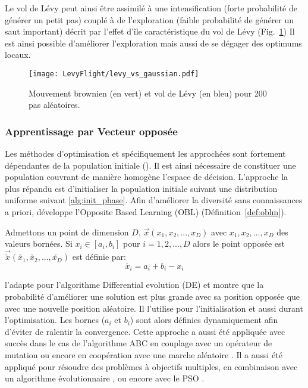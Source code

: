 Le vol de Lévy peut ainsi être assimilé à une intensification (forte probabilité de générer un petit pas)
couplé à de l’exploration (faible probabilité de générer un saut important) décrit par
l’effet d’île caractéristique du vol de Lévy (Fig.~\ref{fig:levy_vs_gaussian})
Il est ainsi possible d’améliorer l’exploration mais aussi de se dégager des optimums locaux.

\begin{figure}
    \begin{center}
        \texttt{[image: LevyFlight/levy\_vs\_gaussian.pdf]}
    \end{center}
    \caption{Mouvement brownien (en vert) et vol de Lévy (en bleu) pour 200 pas aléatoires.
             \label{fig:levy_vs_gaussian}}
\end{figure}
\FloatBarrier


\subsubsection{Apprentissage par Vecteur opposée} %
\label{ssub:apprentissage_par_vecteur_opposee}
Les méthodes d’optimisation et spécifiquement les approchées sont fortement
dépendantes de la population initiale (). Il est ainsi nécessaire
de constituer une population couvrant de manière homogène l’espace de décision.
L’approche la plus répandu est d’initialiser la population initiale suivant une
distribution uniforme suivant \eqref{alg:init_phase}.
Afin d’améliorer la diversité sans connaissances a priori,\cite{Tizhoosh2005695}
développe l’Opposite Based Learning (OBL) (Définition~\ref{def:oblm}).

\begin{Def}\label{def:oblm}
Admettons un point de dimension $D$, $\vec{x}(x_{1}, x_{2}, ..., x_{D})$ avec
$x_{1}, x_{2}, ..., x_{D}$ des valeurs bornées. Si $x_{i} \in [a_{i}, b_{i}]$ pour
$i = 1, 2, ..., D$ alors le point opposée est $\vec{\check{x}}(\check{x_{1}}, \check{x_{2}}, ..., \check{x_{D}})$ est définie par:
\[\check{x_{i}} = a_{i} + b_{i} - x_{i}\]
\end{Def}

\cite{Rahnamayan2008906} l’adapte pour l’algorithme Differential evolution (DE)
et montre que la probabilité d’améliorer une solution est plus grande
avec sa position opposée que avec une nouvelle position aléatoire.
Il l’utilise pour l’initialisation et aussi durant l’optimisation. Les bornes
($a_{i}$ et $b_{i}$) sont alors définies dynamiquement afin d’éviter de ralentir la convergence.
Cette approche a aussi été appliquée avec succès dans le cas de l’algorithme ABC en couplage
avec un opérateur de mutation \parencite{Bi2011174} ou encore en coopération avec une marche
aléatoire \parencite{Sharma2012213}.
Il a aussi été appliqué pour résoudre des problèmes à objectifs multiples,
en combinaison avec un algorithme évolutionnaire \parencite{Ma201448}, ou encore avec le PSO \parencite{Gao2013114}.

